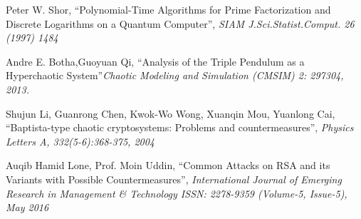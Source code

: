 \documentclass{iitgthesis}
\begin{document}
\begin{thebibliography}{11}
\begin{small}
Peter W. Shor, ``Polynomial-Time Algorithms for Prime Factorization and Discrete Logarithms on a Quantum Computer'', {\em SIAM J.Sci.Statist.Comput. 26 (1997) 1484}

Andre E. Botha,Guoyuan Qi, ``Analysis of the Triple Pendulum as a
Hyperchaotic System''{\em Chaotic Modeling and Simulation (CMSIM) 2: 297{304, 2013}.}

Shujun Li, Guanrong Chen, Kwok-Wo Wong, Xuanqin Mou, Yuanlong Cai, ``Baptista-type chaotic cryptosystems: Problems and countermeasures'', {\em Physics Letters A, 332(5-6):368-375, 2004}

Auqib Hamid Lone, Prof. Moin Uddin, ``Common Attacks on RSA and its Variants with Possible Countermeasures'', {\em International Journal of
Emerging Research in Management \& Technology
ISSN: 2278-9359 (Volume-5, Issue-5), May 2016}


\end{small}
\end{thebibliography}

\end{document}
